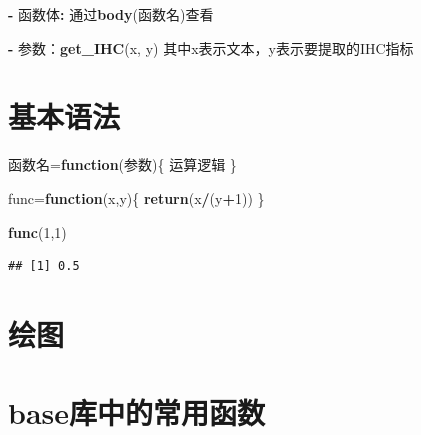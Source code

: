\documentclass[]{book}
\newenvironment{Shaded}{\begin{snugshade}}{\end{snugshade}}
\newcommand{\ControlFlowTok}[1]{\textcolor[rgb]{0.13,0.29,0.53}{\textbf{#1}}}
\newcommand{\DecValTok}[1]{\textcolor[rgb]{0.00,0.00,0.81}{#1}}
\newcommand{\KeywordTok}[1]{\textcolor[rgb]{0.13,0.29,0.53}{\textbf{#1}}}
\newcommand{\NormalTok}[1]{#1}
\newcommand{\OperatorTok}[1]{\textcolor[rgb]{0.81,0.36,0.00}{\textbf{#1}}}
\newcommand{\StringTok}[1]{\textcolor[rgb]{0.31,0.60,0.02}{#1}}
\begin{document}
\begin{Shaded}
\begin{Highlighting}[]
\OperatorTok{-}\StringTok{ }\NormalTok{函数体}\OperatorTok{:}\StringTok{ }\NormalTok{通过}\KeywordTok{body}\NormalTok{(函数名)查看}
\end{Highlighting}
\end{Shaded}

\begin{Shaded}
\begin{Highlighting}[]
\OperatorTok{-}\StringTok{ }\NormalTok{参数：}\KeywordTok{get_IHC}\NormalTok{(x, y) 其中x表示文本，y表示要提取的IHC指标}
\end{Highlighting}
\end{Shaded}

\hypertarget{section-7}{%
\section{基本语法}\label{section-7}}

\begin{Shaded}
\begin{Highlighting}[]
\NormalTok{函数名=}\ControlFlowTok{function}\NormalTok{(参数)\{}
\NormalTok{  运算逻辑}
\NormalTok{\}}
\end{Highlighting}
\end{Shaded}

\begin{Shaded}
\begin{Highlighting}[]
\NormalTok{func=}\ControlFlowTok{function}\NormalTok{(x,y)\{}
  \KeywordTok{return}\NormalTok{(x}\OperatorTok{/}\NormalTok{(y}\OperatorTok{+}\DecValTok{1}\NormalTok{))}
\NormalTok{\}}

\KeywordTok{func}\NormalTok{(}\DecValTok{1}\NormalTok{,}\DecValTok{1}\NormalTok{)}
\end{Highlighting}
\end{Shaded}

\begin{verbatim}
## [1] 0.5
\end{verbatim}

\hypertarget{section-8}{%
\section{绘图}\label{section-8}}

\hypertarget{base}{%
\section{base库中的常用函数}\label{base}}
\end{document}
